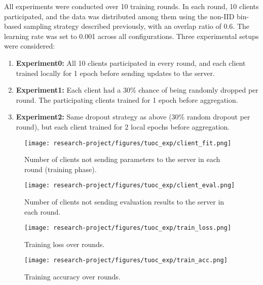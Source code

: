 \documentclass[12pt, a4paper]{article}
\begin{document}
All experiments were conducted over 10 training rounds. In each round, 10 clients participated, and the data was distributed among them using the non-IID bin-based sampling strategy described previously, with an overlap ratio of 0.6. The learning rate was set to 0.001 across all configurations. Three experimental setups were considered:

\begin{enumerate}
\item \textbf{Experiment0:} All 10 clients participated in every round, and each client trained locally for 1 epoch before sending updates to the server.
\item \textbf{Experiment1:} Each client had a 30\% chance of being randomly dropped per round. The participating clients trained for 1 epoch before aggregation.
\item \textbf{Experiment2:} Same dropout strategy as above (30\% random dropout per round), but each client trained for 2 local epochs before aggregation.
\end{enumerate}

\begin{figure}[H]
    \centering
    \begin{minipage}[b]{0.48\textwidth}
        \centering
        \texttt{[image: research-project/figures/tuoc\_exp/client\_fit.png]}
        \caption{Number of clients not sending parameters to the server in each round (training phase).}
        \label{fig:client_fit}
    \end{minipage}
    \hfill
    \begin{minipage}[b]{0.48\textwidth}
        \centering
        \texttt{[image: research-project/figures/tuoc\_exp/client\_eval.png]}
        \caption{Number of clients not sending evaluation results to the server in each round.}
        \label{fig:client_eval}
    \end{minipage}
\end{figure}

\begin{figure}[H]
    \centering
    \begin{minipage}[b]{0.48\textwidth}
        \centering
        \texttt{[image: research-project/figures/tuoc\_exp/train\_loss.png]}
        \caption{Training loss over rounds.}
        \label{fig:train_loss}
    \end{minipage}
    \hfill
    \begin{minipage}[b]{0.48\textwidth}
        \centering
        \texttt{[image: research-project/figures/tuoc\_exp/train\_acc.png]}
        \caption{Training accuracy over rounds.}
        \label{fig:train_acc}
    \end{minipage}
\end{figure}
\end{document}
